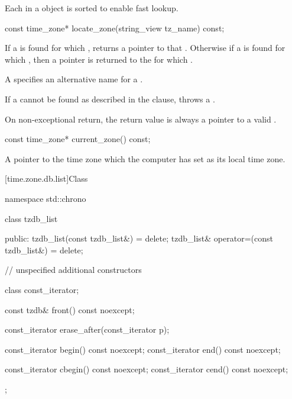 \pnum
Each  in a  object
is sorted to enable fast lookup.

%
\begin{itemdecl}
const time_zone* locate_zone(string_view tz_name) const;
\end{itemdecl}

\begin{itemdescr}
\pnum
\returns
If a  is found
for which ,
returns a pointer to that .
Otherwise
if a  is found
for which ,
then a pointer is returned
to the  for which .
\begin{note}
A  specifies an alternative name for a .
\end{note}

\pnum
\throws
If a  cannot be found
as described in the \returns clause,
throws a .
\begin{note}
On non-exceptional return, the return value is always a pointer to a valid .
\end{note}
\end{itemdescr}

%
\begin{itemdecl}
const time_zone* current_zone() const;
\end{itemdecl}

\begin{itemdescr}
\pnum
\returns
A pointer to the time zone which the computer has set as its local time zone.
\end{itemdescr}

[time.zone.db.list]{Class }

\begin{codeblock}
namespace std::chrono {
  class tzdb_list {
  public:
    tzdb_list(const tzdb_list&) = delete;
    tzdb_list& operator=(const tzdb_list&) = delete;

    // unspecified additional constructors

    class const_iterator;

    const tzdb& front() const noexcept;

    const_iterator erase_after(const_iterator p);

    const_iterator begin() const noexcept;
    const_iterator end()   const noexcept;

    const_iterator cbegin() const noexcept;
    const_iterator cend()   const noexcept;
  };
}
\end{codeblock}

